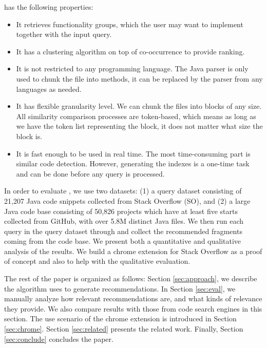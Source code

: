 {\tool} has the following properties:
\begin{itemize}
	\item It retrieves functionality groups, which the user may want to implement together with the input query.
	\item It has a clustering algorithm on top of co-occurrence to provide ranking.
	\item It is not restricted to any programming language. The Java parser is only used to chunk the file into methods, it can be replaced by the parser from any languages as needed.
	\item It has flexible granularity level. We can chunk the files into blocks of any size. All similarity comparison processes are token-based, which means as long as we have the token list representing the block, it does not matter what size the block is.
	\item It is fast enough to be used in real time. The most
          time-consuming part is similar code detection. However,
          generating the indexes is a one-time task and can be done
          before any query is processed.	
\end{itemize}

In order to evaluate {\tool}, we use two datasets: (1) a query dataset
consisting of 21,207 Java code snippets collected from Stack Overflow
(SO), and (2) a large Java code base consisting of 50,826 projects which 
have at least five starts collected from GitHub, with over 5.8M distinct 
Java files. We then run each query in the query dataset through {\tool} 
and collect the recommended fragments coming from the code base. 
We present both a quantitative and qualitative analysis of the results.
We build a chrome extension for Stack Overflow as a proof of concept and also to help with the qualitative evaluation.

The rest of the paper is organized as follows: Section
\ref{sec:approach}, we describe the algorithm {\tool} uses to generate
recommendations. In Section \ref{sec:eval}, we manually analyze how
relevant {\tool} recommendations are, and what kinds of relevance they
provide. We also compare {\tool} results with those from code search
engines in this section. The use scenario of the chrome extension is introduced in Section \ref{sec:chrome}. Section \ref{sec:related} presents the
related work. Finally, Section \ref{sec:conclude} concludes the paper.
